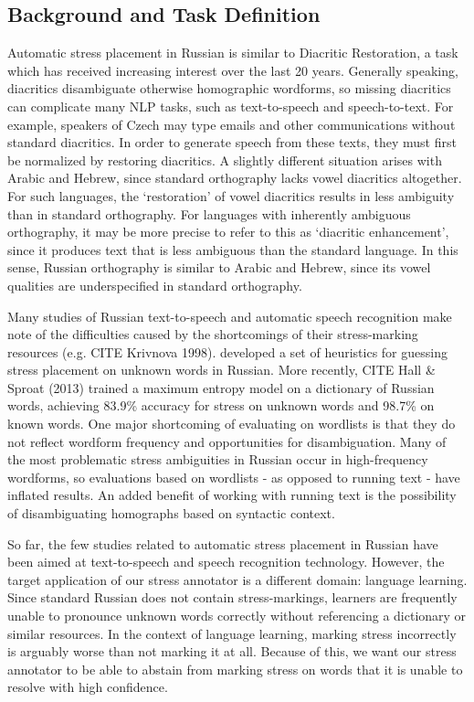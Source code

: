 \documentclass[11pt]{article}
\begin{document}
\subsection{Background and Task Definition}

Automatic stress placement in Russian is similar to Diacritic Restoration, a task
which has received increasing interest over the last 20 years. Generally speaking, diacritics
disambiguate otherwise homographic wordforms, so missing diacritics can
complicate many NLP tasks, such as text-to-speech and speech-to-text. For example, speakers 
of Czech may type emails and other communications
without standard diacritics. In order to generate speech from these texts, they must first be 
normalized by restoring diacritics. A slightly different
situation arises with Arabic and Hebrew, since standard orthography lacks vowel diacritics
altogether. For such languages, the `restoration' of vowel diacritics results in less
ambiguity than in standard orthography. For languages with inherently ambiguous orthography,
it may be more precise to refer to this as `diacritic enhancement', since it produces
text that is less ambiguous than the standard language. In this sense, Russian orthography
is similar to Arabic and Hebrew, since its vowel qualities are underspecified in
standard orthography.

Many studies 
of Russian text-to-speech and automatic speech recognition make note of the 
difficulties caused by the shortcomings of their stress-marking resources (e.g. CITE Krivnova 1998).
\cite{Xomicevic_2008} developed a set of heuristics for guessing stress placement on 
unknown words in Russian. More recently, CITE Hall \& Sproat (2013) trained a maximum entropy
model on a dictionary of Russian words, achieving 83.9\% accuracy for stress on unknown words 
and 98.7\% on known words. One major shortcoming of evaluating on wordlists is 
that they do not reflect wordform frequency and opportunities for disambiguation.
Many of the most problematic stress ambiguities in Russian occur in 
high-frequency wordforms, so evaluations based on wordlists - as opposed to running
text - have inflated results. An added benefit of working with running text
is the possibility of disambiguating homographs based on syntactic context.

So far, the few studies related to automatic stress placement in Russian have been aimed at
text-to-speech and speech recognition technology. However, the target application of our stress
annotator is a different domain: language learning. Since standard Russian does not contain 
stress-markings, learners are frequently unable to pronounce unknown words correctly without
referencing a dictionary or similar resources. In the context
of language learning, marking stress incorrectly is arguably worse than not marking it
at all. Because of this, we want our stress annotator to be able to abstain from marking
stress on words that it is unable to resolve with high confidence.
\end{document}
